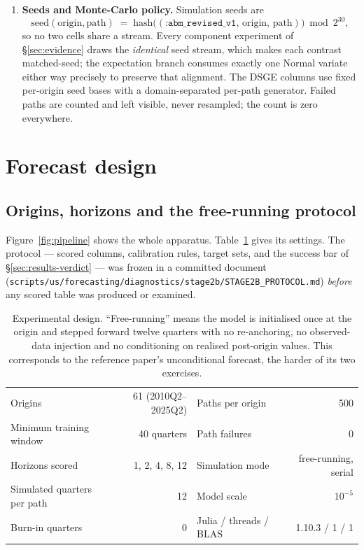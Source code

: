 \documentclass[11pt,a4paper]{article}
\newcommand{\pathc}[1]{{\urlstyle{tt}\nolinkurl{#1}}}
\begin{document}
\begin{enumerate}[label=\textbf{A\arabic*.},leftmargin=2.6em,itemsep=4pt]
\item \textbf{Seeds and Monte-Carlo policy.} Simulation seeds are
\[
  \mathrm{seed}(\text{origin},\text{path}) \;=\;
  \mathrm{hash}\big((\texttt{:abm\_revised\_v1},\,\text{origin},\,\text{path})\big) \bmod 2^{30},
\]
so no two cells share a stream. Every component experiment of \S\ref{sec:evidence} draws the
\emph{identical} seed stream, which makes each contrast matched-seed; the expectation branch
consumes exactly one Normal variate either way precisely to preserve that alignment. The DSGE
columns use fixed per-origin seed bases with a domain-separated per-path generator. Failed paths
are counted and left visible, never resampled; the count is zero everywhere.
\end{enumerate}

\section{Forecast design}
\label{sec:design}

\subsection{Origins, horizons and the free-running protocol}

Figure~\ref{fig:pipeline} shows the whole apparatus. Table~\ref{tab:design} gives its settings.
The protocol --- scored columns, calibration rules, target sets, and the success bar of
\S\ref{sec:results-verdict} --- was frozen in a committed document
(\pathc{scripts/us/forecasting/diagnostics/stage2b/STAGE2B_PROTOCOL.md}) \emph{before} any scored
table was produced or examined.

\begin{table}[t]
\centering
\caption{Experimental design. ``Free-running'' means the model is initialised once at the origin
and stepped forward twelve quarters with no re-anchoring, no observed-data injection and no
conditioning on realised post-origin values. This corresponds to the reference paper's
unconditional forecast, the harder of its two exercises.}
\label{tab:design}
\small
\begin{tabular}{@{}lr@{\quad}lr@{}}
\toprule
Origins & 61 (2010Q2--2025Q2) & Paths per origin & 500 \\
Minimum training window & 40 quarters & Path failures & 0 \\
Horizons scored & 1, 2, 4, 8, 12 & Simulation mode & free-running, serial \\
Simulated quarters per path & 12 & Model scale & $10^{-5}$ \\
Burn-in quarters & 0 & Julia / threads / BLAS & 1.10.3 / 1 / 1 \\
\bottomrule
\end{tabular}
\end{table}
\end{document}
